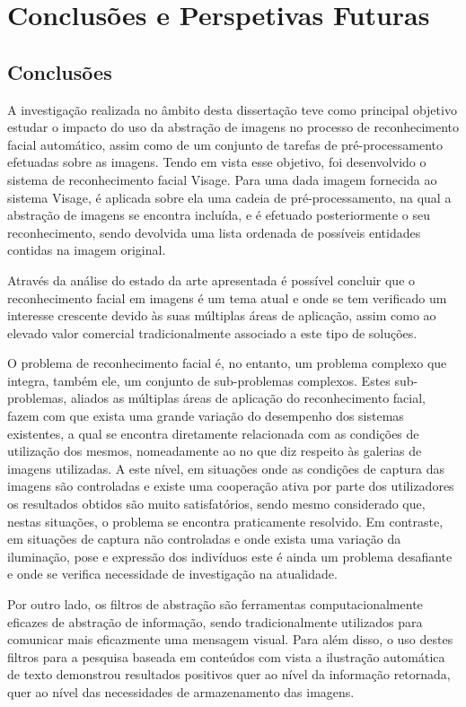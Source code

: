 \chapter{Conclusões e Perspetivas Futuras} \label{chap:conclusao}

\section{Conclusões}
A investigação realizada no âmbito desta dissertação teve como principal objetivo estudar o impacto do uso da abstração de imagens no processo de reconhecimento facial automático, assim como de um conjunto de tarefas de pré-processamento efetuadas sobre as imagens. Tendo em vista esse objetivo, foi desenvolvido o sistema de reconhecimento facial Visage. Para uma dada imagem fornecida ao sistema Visage, é aplicada sobre ela uma cadeia de pré-processamento, na qual a abstração de imagens se encontra incluída, e é efetuado posteriormente o seu reconhecimento, sendo devolvida uma lista ordenada de possíveis entidades contidas na imagem original.

Através da análise do estado da arte apresentada é possível concluir que o reconhecimento facial em imagens é um tema atual e onde se tem verificado um interesse crescente devido às suas múltiplas áreas de aplicação, assim como ao elevado valor comercial tradicionalmente associado a este tipo de soluções. 

O problema de reconhecimento facial é, no entanto, um problema complexo que integra, também ele, um conjunto de sub-problemas  complexos. Estes sub-problemas, aliados as múltiplas áreas de aplicação do reconhecimento facial, fazem com que exista uma grande variação do desempenho dos sistemas existentes, a qual se encontra diretamente relacionada com as condições de utilização dos mesmos, nomeadamente ao no que diz respeito às galerias de imagens utilizadas. A este nível, em situações onde as condições de captura das imagens são controladas e existe uma cooperação ativa por parte dos utilizadores os resultados obtidos são muito satisfatórios, sendo mesmo considerado que, nestas situações, o problema se encontra praticamente resolvido. Em contraste, em situações de captura não controladas e onde exista uma variação da iluminação, pose e expressão dos indivíduos este é ainda um problema desafiante e onde se verifica necessidade de investigação na atualidade.

Por outro lado, os filtros de abstração são ferramentas computacionalmente eficazes de abstração de informação, sendo tradicionalmente utilizados para comunicar mais eficazmente uma mensagem visual. Para além disso, o uso destes filtros para a pesquisa baseada em conteúdos com vista a ilustração automática de texto demonstrou resultados positivos quer ao nível da informação retornada, quer ao nível das necessidades de armazenamento das imagens.

